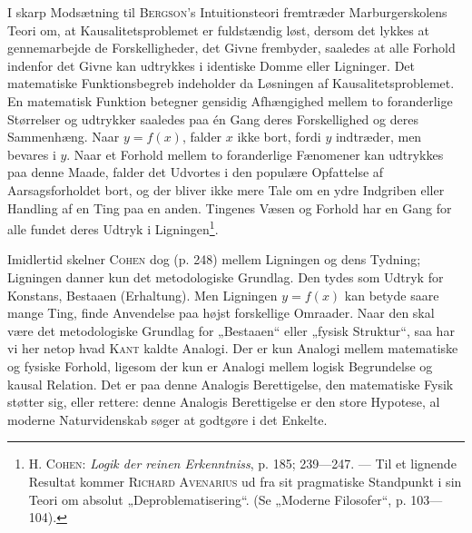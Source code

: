 \documentclass[12pt]{article}
\newcommand{\opage}[1]{\marginnote{\footnotesize\textit{[#1]}}}
\begin{document}
I skarp Modsætning til \textsc{Bergson}'s Intuitionsteori fremtræder
Marburgerskolens Teori om, at Kausalitetsproblemet er fuldstændig løst, dersom
det lykkes at gennemarbejde de Forskelligheder, det Givne frembyder, saaledes at
alle Forhold indenfor det Givne kan udtrykkes i identiske Domme eller Ligninger.
Det matematiske Funktionsbegreb indeholder da Løsningen af Kausalitetsproblemet.
En matematisk Funktion betegner gensidig Afhængighed mellem to foranderlige
Størrelser og udtrykker saaledes paa én Gang deres Forskellighed og deres
Sammenhæng. Naar $y = f(x)$, falder $x$ ikke bort, fordi $y$ indtræder, men
bevares i $y$. Naar et Forhold mellem to foranderlige Fænomener kan udtrykkes
paa denne Maade, falder det Udvortes i den populære Opfattelse af
Aarsagsforholdet bort, og der bliver ikke mere
\setcounter{footnote}{0}%
\opage{47}Tale om en ydre Indgriben eller Handling af en Ting paa en anden.
Tingenes Væsen og Forhold har en Gang for alle fundet deres Udtryk i
Ligningen\footnote{H. \textsc{Cohen}: \textit{Logik der reinen Erkenntniss}, p.
185; 239---247. --- Til et lignende Resultat kommer \textsc{Richard Avenarius}
ud fra sit pragmatiske Standpunkt i sin Teori om absolut „Deproblematisering“.
(Se „Moderne Filosofer“, p. 103---104).}.

Imidlertid skelner \textsc{Cohen} dog (p. 248) mellem Ligningen og dens Tydning;
Ligningen danner kun det metodologiske Grundlag. Den tydes som Udtryk for
Konstans, Bestaaen (Erhaltung). Men Ligningen $y = f(x)$ kan betyde saare mange
Ting, finde Anvendelse paa højst forskellige Omraader. Naar den skal være det
metodologiske Grundlag for „Bestaaen“ eller „fysisk Struktur“, saa har vi her
netop hvad \textsc{Kant} kaldte Analogi. Der er kun Analogi mellem matematiske
og fysiske Forhold, ligesom der kun er Analogi mellem logisk Begrundelse og
kausal Relation. Det er paa denne Analogis Berettigelse, den matematiske Fysik
støtter sig, eller rettere: denne Analogis Berettigelse er den store Hypotese,
al moderne Naturvidenskab søger at godtgøre i det Enkelte.
\end{document}
